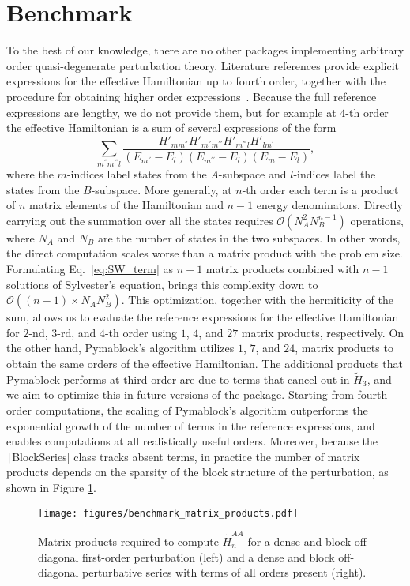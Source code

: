 \section{Benchmark}
\label{sec:benchmark}

To the best of our knowledge, there are no other packages implementing arbitrary order quasi-degenerate perturbation theory.
Literature references provide explicit expressions for the effective Hamiltonian up to fourth order, together with the procedure for obtaining higher order expressions~\cite{Winkler_2003}.
Because the full reference expressions are lengthy, we do not provide them, but for example at $4$-th order the effective Hamiltonian is a sum of several expressions of the form
\begin{equation}
\label{eq:SW_term}
\sum_{m^{''} m^{'''} l}
\frac{H'_{mm^{''}}H'_{m^{''}m^{'''}}H'_{m^{'''}l}H'_{lm^{'}}}{(E_{m^{''}}-E_{l})(E_{m^{'''}}-E_{l})(E_{m}-E_{l})},
\end{equation}
where the $m$-indices label states from the $A$-subspace and $l$-indices label the states from the $B$-subspace.
More generally, at $n$-th order each term is a product of $n$ matrix elements of the Hamiltonian and $n-1$ energy denominators.
Directly carrying out the summation over all the states requires $\mathcal{O}(N_A^2 N_B^{n-1})$ operations, where $N_A$ and $N_B$ are the number of states in the two subspaces.
In other words, the direct computation scales worse than a matrix product with the problem size.
Formulating Eq.~\eqref{eq:SW_term} as $n-1$ matrix products combined with $n-1$ solutions
of Sylvester's equation, brings this complexity down to $\mathcal{O}((n-1) \times N_A N_B^2)$.
This optimization, together with the hermiticity of the sum, allows us to evaluate the reference expressions for the effective Hamiltonian for $2$-nd, $3$-rd, and $4$-th order using $1$, $4$, and $27$ matrix products, respectively.
On the other hand, Pymablock's algorithm utilizes $1$, $7$, and $24$, matrix products to obtain the same orders of the effective Hamiltonian.
The additional products that Pymablock performs at third order are due to terms that cancel out in $\tilde{H}_{3}$, and we aim to optimize this in future versions of the package.
Starting from fourth order computations, the scaling of Pymablock's algorithm outperforms the exponential growth of the number of terms in the reference expressions, and enables computations at all realistically useful orders.
Moreover, because the \texttt|BlockSeries| class tracks absent terms, in practice the number of matrix products depends on the sparsity of the block structure of the perturbation, as shown in Figure \ref{fig:benchmark_matrix_products}.
%
\begin{figure}[h]
    \centering
    \texttt{[image: figures/benchmark\_matrix\_products.pdf]}
    \caption{
        Matrix products required to compute $\tilde{H}^{AA}_{n}$ for
        a dense and block off-diagonal first-order perturbation (left) and a dense and block off-diagonal perturbative series with terms of all orders present (right).
        }
    \label{fig:benchmark_matrix_products}
\end{figure}
%

